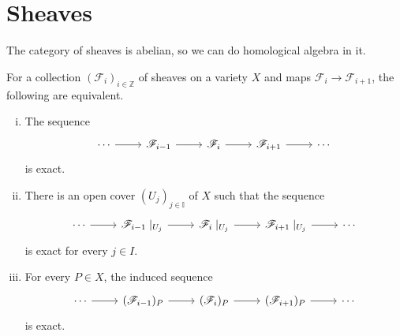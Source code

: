 \documentclass[12pt]{article}
\begin{document}
\section{Sheaves}
The category of sheaves is abelian, so we can do homological
algebra in it.

\begin{thm}\label{thm:ses_equivalence}
  For a collection $(\mathcal{F}_{i})_{i\in\mathbb{Z}}$ of sheaves on
  a variety $X$ and maps ${\mathcal{F}_{i}\to\mathcal{F}_{i+1}}$,
  the following are equivalent.
  \begin{enumerate}[(i)]
    \item The sequence
          \[
            \begin{tikzcd}
              \cdots \arrow{r} & \mathcal{F}_{i-1}\arrow{r}
              & \mathcal{F}_{i}\arrow{r} & \mathcal{F}_{i+1}\arrow{r} & \cdots
            \end{tikzcd}
          \]
          is exact.
    \item There is an open cover $(U_{j})_{j\in\mathbb{I}}$ of $X$ such that
          the sequence
          \[
          \begin{tikzcd}
            \cdots \arrow{r} & \mathcal{F}_{i-1}\mid_{U_{j}}\arrow{r}
            & \mathcal{F}_{i}\mid_{U_{j}}\arrow{r}
            & \mathcal{F}_{i+1}\mid_{U_{j}}\arrow{r} & \cdots
          \end{tikzcd}
          \]
          is exact for every $j\in I$.
    \item For every $P\in X$, the induced sequence
          \[
          \begin{tikzcd}
            \cdots \arrow{r} & (\mathcal{F}_{i-1})_{P}\arrow{r}
            & (\mathcal{F}_{i})_{P}\arrow{r}
            & (\mathcal{F}_{i+1})_{P}\arrow{r} & \cdots
          \end{tikzcd}
          \]
          is exact.
  \end{enumerate}
\end{thm}
\end{document}
